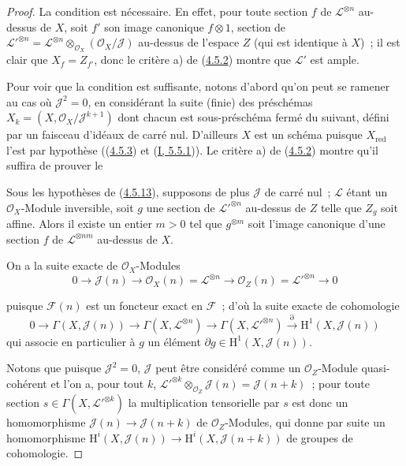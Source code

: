 \begin{proof}
La condition est nécessaire. En effet, pour toute section $f$ de
$\mathcal{L}^{\otimes n}$ au-dessus de $X$, soit $f'$ son image canonique
$f\otimes1$, section de
$\mathcal{L}'^{\otimes n}=\mathcal{L}^{\otimes n}
\otimes_{\mathcal{O}_X}(\mathcal{O}_X/\mathcal{J})$ au-dessus de l'espace
$Z$ (qui est identique à $X$)~; il est clair que $X_f=Z_{f'}$, donc le
critère a) de (\hyperref[II.4.5.2-fr]{4.5.2}) montre que $\mathcal{L}'$ est
ample.

Pour voir que la condition est suffisante, notons d'abord qu'on peut se
ramener au cas où $\mathcal{J}^2=0$, en considérant la suite (finie) des
préschémas
$X_k=(X,\mathcal{O}_X/\mathcal{J}^{k+1})$ dont chacun est sous-préschéma
fermé du suivant, défini par un faisceau d'idéaux de carré nul. D'ailleurs
$X$ est un schéma puisque $X_{\mathrm{red}}$ l'est par hypothèse
((\hyperref[II.4.5.3-fr]{4.5.3}) et
(\hyperref[I.5.5.1-fr]{I, 5.5.1})). Le critère a) de
(\hyperref[II.4.5.2-fr]{4.5.2}) montre qu'il suffira de prouver le

\begin{lemma}[4.5.13.1]
\label{II.4.5.13.1-fr}
Sous les hypothèses de (\hyperref[II.4.5.13-fr]{4.5.13}), supposons de plus
$\mathcal{J}$ de carré nul~; $\mathcal{L}$ étant un
$\mathcal{O}_X$-Module inversible, soit $g$ une section de
$\mathcal{L}'^{\otimes n}$ au-dessus de $Z$ telle que $Z_g$ soit affine.
Alors il existe un entier $m>0$ tel que $g^{\otimes m}$ soit l'image
canonique d'une section $f$ de $\mathcal{L}^{\otimes nm}$ au-dessus de $X$.
\end{lemma}

On a la suite exacte de $\mathcal{O}_X$-Modules
\[
  0\longrightarrow\mathcal{J}(n)\longrightarrow
  \mathcal{O}_X(n)=\mathcal{L}^{\otimes n}\longrightarrow
  \mathcal{O}_Z(n)=\mathcal{L}'^{\otimes n}\longrightarrow0
\]


puisque $\mathcal{F}(n)$ est un foncteur exact en $\mathcal{F}$~; d'où la
suite exacte de cohomologie
\[
  0\longrightarrow\Gamma(X,\mathcal{J}(n))\longrightarrow
  \Gamma(X,\mathcal{L}^{\otimes n})\longrightarrow
  \Gamma(X,\mathcal{L}'^{\otimes n})\xrightarrow{\partial}
  \mathrm{H}^1(X,\mathcal{J}(n))
\]
qui associe en particulier à $g$ un élément
$\partial g\in\mathrm{H}^1(X,\mathcal{J}(n))$.

Notons que puisque $\mathcal{J}^2=0$, $\mathcal{J}$ peut être considéré
comme un $\mathcal{O}_Z$-Module quasi-cohérent et l'on a, pour tout $k$,
$\mathcal{L}'^{\otimes k}\otimes_{\mathcal{O}_Z}\mathcal{J}(n)
=\mathcal{J}(n+k)$~; pour toute section
$s\in\Gamma(X,\mathcal{L}'^{\otimes k})$ la multiplication tensorielle par
$s$ est donc un homomorphisme $\mathcal{J}(n)\to\mathcal{J}(n+k)$ de
$\mathcal{O}_Z$-Modules, qui donne par suite un homomorphisme
$\mathrm{H}^i(X,\mathcal{J}(n))\to
\mathrm{H}^i(X,\mathcal{J}(n+k))$ de groupes de cohomologie.


\end{proof}
